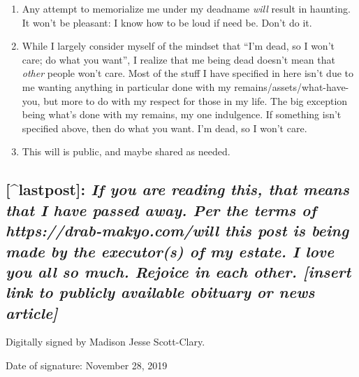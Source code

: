 \begin{enumerate}
\def\labelenumi{\arabic{enumi}.}
\tightlist
\item
  Any attempt to memorialize me under my deadname \emph{will} result in haunting. It won't be pleasant: I know how to be loud if need be. Don't do it.
\item
  While I largely consider myself of the mindset that ``I'm dead, so I won't care; do what you want'', I realize that me being dead doesn't mean that \emph{other} people won't care. Most of the stuff I have specified in here isn't due to me wanting anything in particular done with my remains/assets/what-have-you, but more to do with my respect for those in my life. The big exception being what's done with my remains, my one indulgence. If something isn't specified above, then do what you want. I'm dead, so I won't care.
\item
  This will is public, and maybe shared as needed.
\end{enumerate}

\hypertarget{lastpost-if-you-are-reading-this-that-means-that-i-have-passed-away.-per-the-terms-of-httpsdrab-makyo.comwill-this-post-is-being-made-by-the-executors-of-my-estate.-i-love-you-all-so-much.-rejoice-in-each-other.-insert-link-to-publicly-available-obituary-or-news-article}{%
\subsection*{\texorpdfstring{{[}\^{}lastpost{]}: \emph{If you are reading this, that means that I have passed away. Per the terms of https://drab-makyo.com/will this post is being made by the executor(s) of my estate. I love you all so much. Rejoice in each other. {[}insert link to publicly available obituary or news article{]}}}{{[}\^{}lastpost{]}: If you are reading this, that means that I have passed away. Per the terms of https://drab-makyo.com/will this post is being made by the executor(s) of my estate. I love you all so much. Rejoice in each other. {[}insert link to publicly available obituary or news article{]}}}\label{lastpost-if-you-are-reading-this-that-means-that-i-have-passed-away.-per-the-terms-of-httpsdrab-makyo.comwill-this-post-is-being-made-by-the-executors-of-my-estate.-i-love-you-all-so-much.-rejoice-in-each-other.-insert-link-to-publicly-available-obituary-or-news-article}}

Digitally signed by Madison Jesse Scott-Clary.

Date of signature: November 28, 2019
